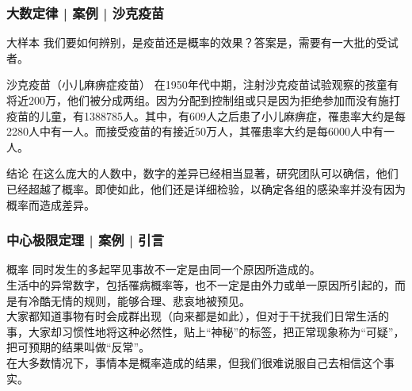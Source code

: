 \begin{frame}
  \frametitle{大数定律 | 案例 | 沙克疫苗}
  \begin{block}{大样本}
    我们要如何辨别，是疫苗还是概率的效果？答案是，需要有一大批的受试者。
  \end{block}
  \pause
  \begin{block}{沙克疫苗（小儿麻痹症疫苗）}
    在1950年代中期，注射沙克疫苗试验观察的孩童有将近200万，他们被分成两组。因为分配到控制组或只是因为拒绝参加而没有施打疫苗的儿童，有1388785人。其中，有609人之后患了小儿麻痹症，罹患率大约是每2280人中有一人。而接受疫苗的有接近50万人，其罹患率大约是每6000人中有一人。
  \end{block}
  \pause
  \begin{block}{结论}
    在这么庞大的人数中，数字的差异已经相当显著，研究团队可以确信，他们已经超越了概率。即使如此，他们还是详细检验，以确定各组的感染率并没有因为概率而造成差异。
  \end{block}
\end{frame}

\begin{frame}
  \frametitle{中心极限定理 | 案例 | 引言}
  \begin{block}{概率}
    同时发生的多起罕见事故不一定是由同一个原因所造成的。\\
    \vspace{0.5em}
    生活中的异常数字，包括罹病概率等，也不一定是由外力或单一原因所引起的，而是有冷酷无情的规则，能够合理、悲哀地被预见。\\
    \vspace{0.5em}
大家都知道事物有时会成群出现（向来都是如此），但对于干扰我们日常生活的事，大家却习惯性地将这种必然性，贴上“神秘”的标签，把正常现象称为“可疑”，把可预期的结果叫做“反常”。\\
    \vspace{0.5em}
    在大多数情况下，事情本是概率造成的结果，但我们很难说服自己去相信这个事实。
  \end{block}
\end{frame}

